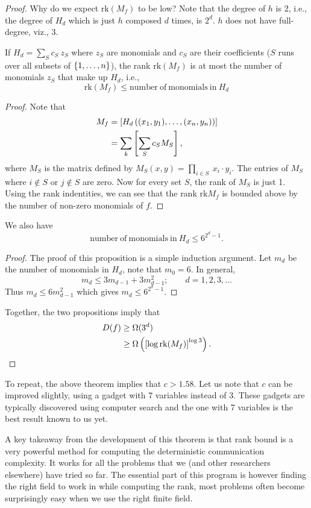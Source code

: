 \documentclass[usletter]{article}
\providecommand\rbrac[1]{\ensuremath \left(#1\right)}
\providecommand\sqbrac[1]{\ensuremath \left[#1\right]}
\providecommand\cbrac[1]{\ensuremath \left\{#1\right\}}
\newcommand{\rk}{\mathrm{rk}}
\newcommand{\mf}{M_f}
\newcommand{\df}{D(f)}
\begin{document}
\begin{proof}
Why do we expect $\rk (\mf)$ to be low? Note that the degree of $h$ is 2, i.e., the degree of $H_d$ which is just $h$ composed $d$ times, is $2^d$. $h$ does not have full-degree, viz., 3.

\begin{proposition}
If $H_d = \sum_S c_S\ z_S$ where $z_S$ are monomials and $c_S$ are their coefficients ($S$ runs over all subsets of $\cbrac{1, \ldots, n}$), the rank $\rk (\mf)$ is at most the number of monomials $z_S$ that make up $H_d$, i.e.,
$$
\rk (\mf) \leq \mathrm{number\ of\ monomials\ in}\ H_d
$$
\end{proposition}
\begin{proof}
Note that
\begin{align*}
    \mf &= \sqbrac{H_d \rbrac{(x_1, y_1), \ldots, (x_n, y_n)}}\\
    &= \sum_k \sqbrac{\sum_S c_S M_S},
\end{align*}
where $M_S$ is the matrix defined by $M_S(x,y) = \prod_{i \in S}\ x_i \cdot y_i$. The entries of $M_S$ where $i \notin S$ or $j \notin S$ are zero. Now for every set $S$, the rank of $M_S$ is just 1. Using the rank indentities, we can see that the rank $\rk \mf$ is bounded above by the number of non-zero monomials of $f$.
\end{proof}

\begin{proposition}
We also have 
$$
\mathrm{number\ of\ monomials\ in}\ H_d \leq 6^{2^d -1}.
$$
\end{proposition}
\begin{proof}
The proof of this proposition is a simple induction argument. Let $m_d$ be the number of monomials in $H_d$, note that $m_0 = 6$. In general,
$$
m_d \leq 3 m_{d-1} + 3 m_{d-1}^2; \qquad d = 1, 2, 3, \ldots
$$
Thus $m_d \leq 6 m_{d-1}^2$ which gives $m_d \leq 6^{2^d - 1}$.
\end{proof}

Together, the two propositions imply that
\begin{align*}
\df &\geq \Omega(3^d)\\
& \geq \Omega \rbrac{\sqbrac{\log \rk (\mf)}^{\log 3} }.
\end{align*}
\end{proof}

\begin{remark}
To repeat, the above theorem implies that $c > 1.58$. Let us note that $c$ can be improved slightly, using a gadget with 7 variables instead of 3. These gadgets are typically discovered using computer search and the one with 7 variables is the best result known to us yet.

A key takeaway from the development of this theorem is that rank bound is a very powerful method for computing the deterministic communication complexity. It works for all the problems that we (and other researchers elsewhere) have tried so far. The essential part of this program is however finding the right field to work in while computing the rank, most problems often become surprisingly easy when we use the right finite field.
\end{remark}
\end{document}
